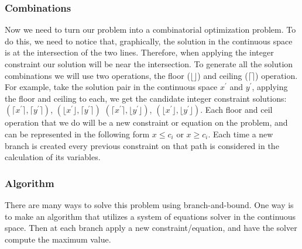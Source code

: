         \subsubsection{Combinations}
        Now we need to turn our problem into a combinatorial optimization problem.
        To do this, we need to notice that, graphically, the solution in the continuous space is at 
        the intersection of the two lines. Therefore, when applying the integer constraint our
        solution will be near the intersection. To generate all the solution combinations we will 
        use two operations, the floor ($\lfloor \rfloor$) and ceiling ($\lceil \rceil$) operation. 
        For example, take the solution pair in the continuous space $x^{'}$ and $y^{'}$,
        applying the floor and ceiling to each, we get the candidate integer constraint solutions:  
        $(\lceil x^{'} \rceil, \lceil y^{'} \rceil)$, $(\lfloor x^{'} \rfloor, \lceil y^{'} \rceil)$
        $(\lceil x^{'} \rceil, \lfloor y^{'} \rfloor)$, $(\lfloor x^{'} \rfloor, \lfloor y^{'} \rfloor)$.
        Each floor and ceil operation that we do will be a new constraint or equation on the problem,
        and can be represented in the following form $x \leq c_i$ or $x \geq c_i$. 
        Each time a new branch is created every previous constraint on that path is 
        considered in the calculation of its variables.

        \subsubsection{Algorithm}
        There are many ways to solve this problem using branch-and-bound.
        One way is to make an algorithm that utilizes a system of equations solver in the continuous space.
        Then at each branch apply a new constraint/equation, and have the solver compute the maximum value.

        